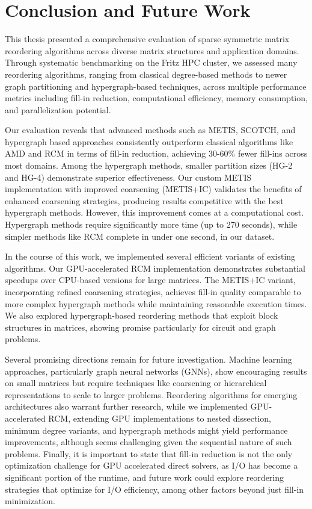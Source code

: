 \chapter{Conclusion and Future Work}
\label{ch:conclusion}

This thesis presented a comprehensive evaluation of sparse symmetric matrix reordering algorithms across diverse matrix structures and application domains. Through systematic benchmarking on the Fritz HPC cluster, we assessed many reordering algorithms, ranging from classical degree-based methods to newer graph partitioning and hypergraph-based techniques, across multiple performance metrics including fill-in reduction, computational efficiency, memory consumption, and parallelization potential.

Our evaluation reveals that advanced methods such as METIS, SCOTCH, and hypergraph based approaches consistently outperform classical algorithms like AMD and RCM in terms of fill-in reduction, achieving 30-60\% fewer fill-ins across most domains. Among the hypergraph methods, smaller partition sizes (HG-2 and HG-4) demonstrate superior effectiveness. Our custom METIS implementation with improved coarsening (METIS+IC) validates the benefits of enhanced coarsening strategies, producing results competitive with the best hypergraph methods. However, this improvement comes at a computational cost. Hypergraph methods require significantly more time (up to 270 seconds), while simpler methods like RCM complete in under one second, in our dataset.

In the course of this work, we implemented several efficient variants of existing algorithms. Our GPU-accelerated RCM implementation demonstrates substantial speedups over CPU-based versions for large matrices. The METIS+IC variant, incorporating refined coarsening strategies, achieves fill-in quality comparable to more complex hypergraph methods while maintaining reasonable execution times. We also explored hypergraph-based reordering methods that exploit block structures in matrices, showing promise particularly for circuit and graph problems. 


Several promising directions remain for future investigation. Machine learning approaches, particularly graph neural networks (GNNs), show encouraging results on small matrices but require techniques like coarsening or hierarchical representations to scale to larger problems. Reordering algorithms for emerging architectures also warrant further research, while we implemented GPU-accelerated RCM, extending GPU implementations to nested dissection, minimum degree variants, and hypergraph methods might yield performance improvements, although seems challenging given the sequential nature of such problems. Finally, it is important to state that fill-in reduction is not the only optimization challenge for GPU accelerated direct solvers, as I/O has become a significant portion of the runtime, and future work could explore reordering strategies that optimize for I/O efficiency, among other factors beyond just fill-in minimization.


